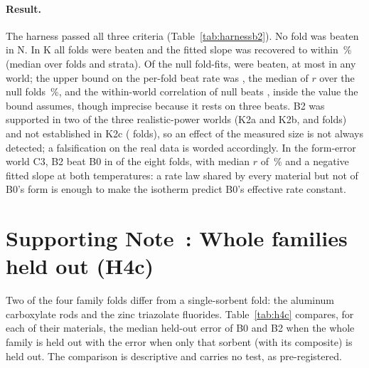 \documentclass[11pt]{article}
\begin{document}
\paragraph{Result.} The harness passed all three criteria (Table~\ref{tab:harnessb2}). No fold was beaten in N. In K
all  folds were beaten and the fitted slope was recovered to within \,\% (median
over folds and strata). Of the  null fold-fits,  were beaten, at most
 in any world; the upper bound on the per-fold beat rate was , the median of $r$
over the null folds \,\%, and the within-world correlation of null beats , inside
the value the bound assumes, though imprecise because it rests on three beats. B2 was supported in two of the three realistic-power worlds (K2a and K2b,
 and  folds) and not established in K2c ( folds), so an effect of the
measured size is not always detected; a falsification on the real data is worded accordingly. In the form-error world
C3, B2 beat B0 in  of the eight folds, with median $r$ of \,\% and a negative fitted slope at both
temperatures: a rate law shared by every material but not of B0's form is enough to make the isotherm predict B0's
effective rate constant.

\begin{table}[h]
\centering
\small\setlength{\tabcolsep}{\ID{4pt}}
\caption{B2 harness per world (synthetic data). Folds beaten by the decision rule, median relative improvement $r$
over folds, median over folds of the median held-out error $E$ of B0 and B2, and the median fitted slope $b$ per
temperature (\textdegree C) and direction (ads, uptake; des, release). True slopes:  in K; in K2a--c  at
~\textdegree C and  at ~\textdegree C; none in N, S0--S5 and
C3.}\label{tab:harnessb2}

\end{table}

\section*{Supporting Note~: Whole families held out (H4c)}

Two of the four family folds differ from a single-sorbent fold: the aluminum carboxylate rods and the zinc triazolate
fluorides. Table~\ref{tab:h4c} compares, for each of their materials, the median held-out error of B0 and B2 when the
whole family is held out with the error when only that sorbent (with its composite) is held out. The comparison is
descriptive and carries no test, as pre-registered.
\end{document}

